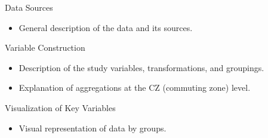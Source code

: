 \begin{frame}{Data Sources}
    \begin{itemize}
        \item General description of the data and its sources.
    \end{itemize}
\end{frame}

\begin{frame}{Variable Construction}
    \begin{itemize}
        \item Description of the study variables, transformations, and groupings.
        \item Explanation of aggregations at the CZ (commuting zone) level.
    \end{itemize}
\end{frame}

\begin{frame}{Visualization of Key Variables}
    \begin{itemize}
        \item Visual representation of data by groups.
    \end{itemize}
\end{frame}